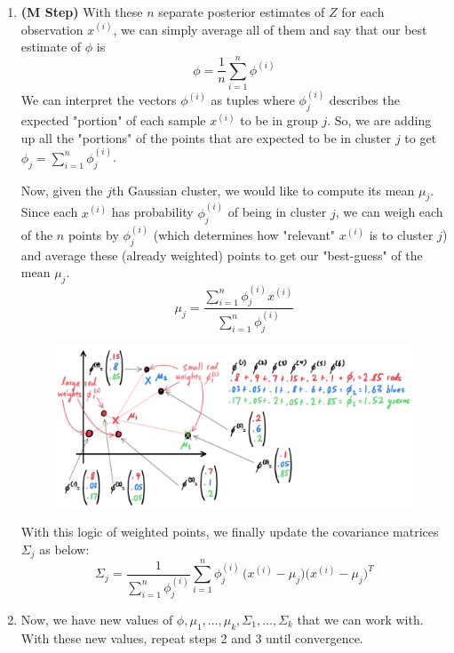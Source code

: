\begin{algo}
\begin{enumerate}
      \item \textbf{(M Step)} With these $n$ separate posterior estimates of $Z$ for each observation $x^{(i)}$, we can simply average all of them and say that our best estimate of $\phi$ is
      \begin{equation}
        \phi = \frac{1}{n} \sum_{i=1}^n \phi^{(i)}
      \end{equation}
      We can interpret the vectors $\phi^{(i)}$ as tuples where $\phi^{(i)}_j$ describes the expected "portion" of each sample $x^{(i)}$ to be in group $j$. So, we are adding up all the "portions" of the points that are expected to be in cluster $j$ to get $\phi_j = \sum_{i=1}^n \phi_j^{(i)}$.

      Now, given the $j$th Gaussian cluster, we would like to compute its mean $\mu_j$. Since each $x^{(i)}$ has probability $\phi^{(i)}_j$ of being in cluster $j$, we can weigh each of the $n$ points by $\phi^{(i)}_j$ (which determines how "relevant" $x^{(i)}$ is to cluster $j$) and average these (already weighted) points to get our "best-guess" of the mean $\mu_j$.
      \begin{equation}
        \mu_j = \frac{\sum_{i=1}^n \phi^{(i)}_j x^{(i)}}{\sum_{i=1}^n \phi_j^{(i)}}
      \end{equation}

      \begin{figure}[H]
        \centering 
        \includegraphics[scale=0.27]{img/weighted_means.jpg}
        \caption{} 
        \label{fig:weighted_means}
      \end{figure}

      With this logic of weighted points, we finally update the covariance matrices $\Sigma_j$ as below:
      \begin{equation}
        \Sigma_j = \frac{1}{\sum_{i=1}^n \phi_j^{(i)}} \sum_{i=1}^n \phi^{(i)}_j \,\big(x^{(i)} - \mu_j\big)\big(x^{(i)} - \mu_j\big)^T
      \end{equation}

      \item Now, we have new values of $\phi, \mu_1, \ldots, \mu_k, \Sigma_1, \ldots, \Sigma_k$ that we can work with. With these new values, repeat steps 2 and 3 until convergence.
    \end{enumerate}
  \end{algo}

